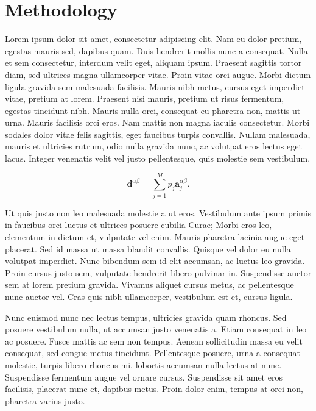 \documentclass[manuscript]{geophysics}
\newcommand{\vect}[1]{\mathbf{#1}}
\begin{document}
\section{Methodology}

Lorem ipsum dolor sit amet, consectetur adipiscing elit. Nam eu dolor pretium,
egestas mauris sed, dapibus quam. Duis hendrerit mollis nunc a consequat. Nulla
et sem consectetur, interdum velit eget, aliquam ipsum. Praesent sagittis
tortor diam, sed ultrices magna ullamcorper vitae. Proin vitae orci augue.
Morbi dictum ligula gravida sem malesuada facilisis. Mauris nibh metus, cursus
eget imperdiet vitae, pretium at lorem. Praesent nisi mauris, pretium ut risus
fermentum, egestas tincidunt nibh. Mauris nulla orci, consequat eu pharetra
non, mattis ut urna. Mauris facilisis orci eros. Nam mattis non magna iaculis
consectetur. Morbi sodales dolor vitae felis sagittis, eget faucibus turpis
convallis. Nullam malesuada, mauris et ultricies rutrum, odio nulla gravida
nunc, ac volutpat eros lectus eget lacus. Integer venenatis velit vel justo
pellentesque, quis molestie sem vestibulum.

\begin{equation}
    \vect{d}^{\alpha\beta} = \sum\limits_{j=1}^{M} p_j \vect{a}_j^{\alpha\beta}.
    \label{eq:dalphabeta_sum}
\end{equation}

Ut quis justo non leo malesuada molestie a ut eros. Vestibulum ante ipsum
primis in faucibus orci luctus et ultrices posuere cubilia Curae; Morbi eros
leo, elementum in dictum et, vulputate vel enim. Mauris pharetra lacinia augue
eget placerat. Sed id massa ut massa blandit convallis. Quisque vel dolor eu
nulla volutpat imperdiet. Nunc bibendum sem id elit accumsan, ac luctus leo
gravida. Proin cursus justo sem, vulputate hendrerit libero pulvinar in.
Suspendisse auctor sem at lorem pretium gravida. Vivamus aliquet cursus metus,
ac pellentesque nunc auctor vel. Cras quis nibh ullamcorper, vestibulum est et,
cursus ligula.

Nunc euismod nunc nec lectus tempus, ultricies gravida quam rhoncus. Sed
posuere vestibulum nulla, ut accumsan justo venenatis a. Etiam consequat in leo
ac posuere. Fusce mattis ac sem non tempus. Aenean sollicitudin massa eu velit
consequat, sed congue metus tincidunt. Pellentesque posuere, urna a consequat
molestie, turpis libero rhoncus mi, lobortis accumsan nulla lectus at nunc.
Suspendisse fermentum augue vel ornare cursus. Suspendisse sit amet eros
facilisis, placerat nunc et, dapibus metus. Proin dolor enim, tempus at orci
non, pharetra varius justo.
\end{document}
